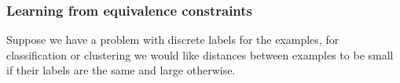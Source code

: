\documentclass[a4paper,titlepage]{article}
\renewcommand{\vec}[1]{\mathbf{#1}}
\newcommand{\mat}[1]{\mathbf{#1}}
\begin{document}




\subsubsection{Learning from equivalence constraints}

Suppose we have a problem with discrete labels for the examples, for classification or clustering we would like distances between examples to be small if their labels are the same and large otherwise.


\end{document}
